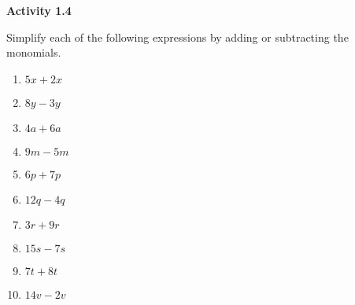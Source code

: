 \vspace{1ex}
\noindent\textbf{Activity 1.4}

\vspace{0.75ex}

Simplify each of the following expressions by adding or subtracting the monomials.
\begin{multicols}{2}
\begin{enumerate}
    \item \( 5x + 2x \)
    \item \( 8y - 3y \)
    \item \( 4a + 6a \)
    \item \( 9m - 5m \)
    \item \( 6p + 7p \)
    \item \( 12q - 4q \)
    \item \( 3r + 9r \)
    \item \( 15s - 7s \)
    \item \( 7t + 8t \)
    \item \( 14v - 2v \)
\end{enumerate}
\end{multicols} 